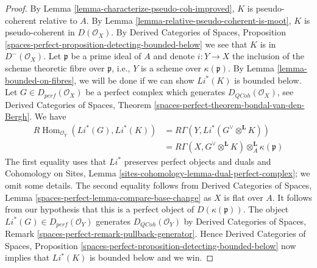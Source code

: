 \documentclass[10pt,a4paper]{amsart}
\theoremstyle{plain}
\theoremstyle{definition}
\theoremstyle{remark}
\numberwithin{equation}{subsection}
\def\Hom{\mathop{\mathrm{Hom}}\nolimits}
\def\QCoh{\mathit{QCoh}}
\begin{document}
\begin{proof}
By Lemma \ref{lemma-characterize-pseudo-coh-improved},
$K$ is pseudo-coherent relative to $A$. By Lemma
\ref{lemma-relative-pseudo-coherent-is-moot},
$K$ is pseudo-coherent in $D(\mathcal{O}_X)$.
By Derived Categories of Spaces, Proposition
\ref{spaces-perfect-proposition-detecting-bounded-below}
we see that $K$ is in $D^-(\mathcal{O}_X)$.
Let $\mathfrak{p}$ be a prime ideal of $A$ and denote
$i : Y \to X$ the inclusion of the scheme theoretic
fibre over $\mathfrak{p}$, i.e., $Y$ is a scheme over $\kappa(\mathfrak p)$.
By Lemma \ref{lemma-bounded-on-fibres},
we will be done if we can show  $Li^*(K)$ is bounded below. 
Let $G \in D_{perf} (\mathcal{O}_X)$ be a perfect
complex which generates $D_\QCoh (\mathcal{O}_X)$,
see Derived Categories of Spaces, Theorem
\ref{spaces-perfect-theorem-bondal-van-den-Bergh}.
We have
\begin{align*}
R\Hom _{\mathcal{O}_Y}(Li^*(G), Li^*(K))
& =
R\Gamma(Y, Li^*(G ^\vee \otimes ^\mathbf{L} K)) \\
& =
R\Gamma(X, G^\vee \otimes ^{\mathbf{L}} K)
\otimes^\mathbf{L}_A \kappa(\mathfrak{p})
\end{align*}
The first equality uses that $Li^*$ preserves perfect objects and duals
and Cohomology on Sites, Lemma
\ref{sites-cohomology-lemma-dual-perfect-complex}; we omit
some details. The second equality follows from
Derived Categories of Spaces, Lemma
\ref{spaces-perfect-lemma-compare-base-change}
as $X$ is flat over $A$. It follows from our hypothesis that this is a
perfect object of $D(\kappa(\mathfrak{p}))$. The object
$Li^*(G) \in D_{perf}(\mathcal{O}_Y)$  generates $D_\QCoh(\mathcal{O}_Y)$ by
Derived Categories of Spaces, Remark
\ref{spaces-perfect-remark-pullback-generator}.
Hence Derived Categories of Spaces, Proposition
\ref{spaces-perfect-proposition-detecting-bounded-below}
now implies that $Li^*(K)$ is bounded below and we win.
\end{proof}
\end{document}
